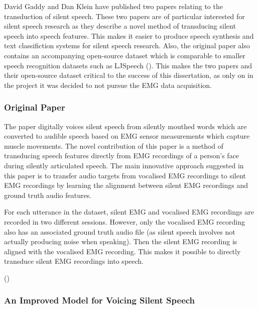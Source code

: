 David Gaddy and Dan Klein have published two papers relating to the transduction of
silent speech. These two papers are of particular interested for silent speech research
as they describe a novel method of transducing silent speech into speech features.
This makes it easier to produce speech synthesis and text classifiction systems
for silent speech research. Also, the original paper also contains an accompanying
open-source dataset which is comparable to smaller speech recognition datasets
such as LJSpeech (\cite{ljspeech17}). This makes the two papers and their open-source
dataset critical to the success of this dissertation, as only on in the project it
was decided to not pursue the EMG data acquisition.

\subsubsection{Original Paper}

The paper digitally voices silent speech from silently mouthed words which are
converted to audible speech based on EMG sensor measurements which capture muscle movements.
The novel contribution of this paper is  
a method of transducing speech features directly from EMG recordings
of a person's face during silently articulated speech. The main innovative approach
suggested in this paper is to transfer audio targets from vocalised EMG recordings
to silent EMG recordings by learning the alignment between silent EMG recordings
and ground truth audio features.

For each utterance in the dataset, silent EMG and vocalised EMG recordings are recorded
in two different sessions. However, only the vocalised EMG recording also has an associated
ground truth audio file (as silent speech involves not actually producing noise when
speaking). Then the silent EMG recording is aligned with the vocalised EMG recording.
This makes it possible to directly transduce silent EMG recordings into speech.


\iffalse
Other papers have used this approach to FILL REST OF THIS WITH REFERENCED TO SPEECH AND TO TEXT
FROM DIGITAL VOICING, MIT ALTER EGO 2018 SUMMARISED AND 60 PG VERSION AND OTHER SOURCES.
\fi

(\cite{gaddy2020digital})

\subsubsection{An Improved Model for Voicing Silent Speech}

